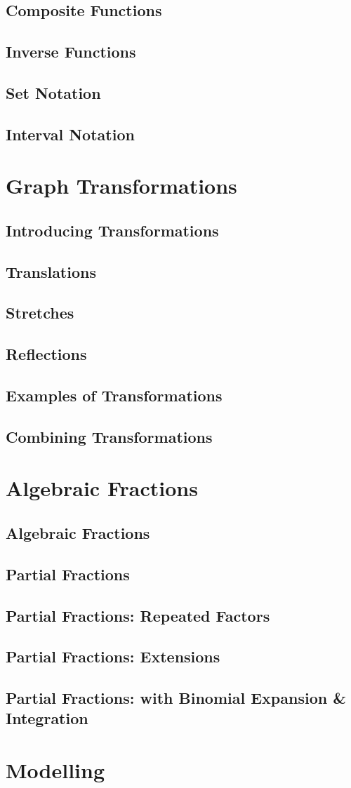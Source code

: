 \documentclass[../maths.tex]{subfiles}
\begin{document}
\subsection*{Composite Functions}
\subsection*{Inverse Functions}
\subsection*{Set Notation}
\subsection*{Interval Notation}
\section{Graph Transformations}
\subsection*{Introducing Transformations}
\subsection*{Translations}
\subsection*{Stretches}
\subsection*{Reflections}
\subsection*{Examples of Transformations}
\subsection*{Combining Transformations}
\section{Algebraic Fractions}
\subsection*{Algebraic Fractions}
\subsection*{Partial Fractions}
\subsection*{Partial Fractions: Repeated Factors}
\subsection*{Partial Fractions: Extensions}
\subsection*{Partial Fractions: with Binomial Expansion \& Integration}
\section{Modelling}
\end{document}
